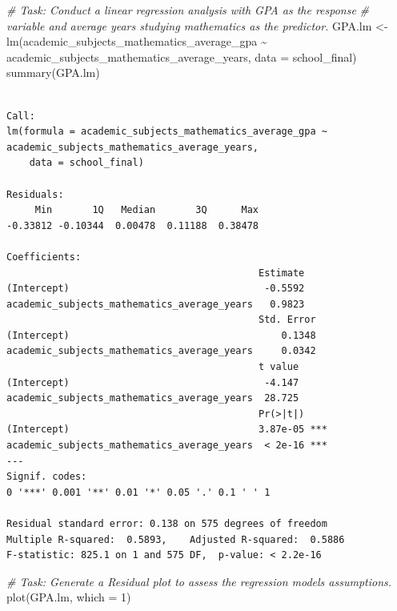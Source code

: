 \documentclass[
]{book}
\newenvironment{Shaded}{\begin{snugshade}}{\end{snugshade}}
\newcommand{\AttributeTok}[1]{\textcolor[rgb]{0.77,0.63,0.00}{#1}}
\newcommand{\CommentTok}[1]{\textcolor[rgb]{0.56,0.35,0.01}{\textit{#1}}}
\newcommand{\DecValTok}[1]{\textcolor[rgb]{0.00,0.00,0.81}{#1}}
\newcommand{\FunctionTok}[1]{\textcolor[rgb]{0.00,0.00,0.00}{#1}}
\newcommand{\NormalTok}[1]{#1}
\newcommand{\OtherTok}[1]{\textcolor[rgb]{0.56,0.35,0.01}{#1}}
\newcommand{\SpecialCharTok}[1]{\textcolor[rgb]{0.00,0.00,0.00}{#1}}
\begin{document}
\begin{Shaded}
\begin{Highlighting}[]
\CommentTok{\# Task: Conduct a linear regression analysis with GPA as the response}
\CommentTok{\# variable and average years studying mathematics as the predictor.}
\NormalTok{GPA.lm }\OtherTok{\textless{}{-}} \FunctionTok{lm}\NormalTok{(academic\_subjects\_mathematics\_average\_gpa }\SpecialCharTok{\textasciitilde{}}\NormalTok{ academic\_subjects\_mathematics\_average\_years, }
             \AttributeTok{data =}\NormalTok{ school\_final)}
\FunctionTok{summary}\NormalTok{(GPA.lm)}
\end{Highlighting}
\end{Shaded}

\begin{verbatim}

Call:
lm(formula = academic_subjects_mathematics_average_gpa ~ academic_subjects_mathematics_average_years, 
    data = school_final)

Residuals:
     Min       1Q   Median       3Q      Max 
-0.33812 -0.10344  0.00478  0.11188  0.38478 

Coefficients:
                                            Estimate
(Intercept)                                  -0.5592
academic_subjects_mathematics_average_years   0.9823
                                            Std. Error
(Intercept)                                     0.1348
academic_subjects_mathematics_average_years     0.0342
                                            t value
(Intercept)                                  -4.147
academic_subjects_mathematics_average_years  28.725
                                            Pr(>|t|)    
(Intercept)                                 3.87e-05 ***
academic_subjects_mathematics_average_years  < 2e-16 ***
---
Signif. codes:  
0 '***' 0.001 '**' 0.01 '*' 0.05 '.' 0.1 ' ' 1

Residual standard error: 0.138 on 575 degrees of freedom
Multiple R-squared:  0.5893,    Adjusted R-squared:  0.5886 
F-statistic: 825.1 on 1 and 575 DF,  p-value: < 2.2e-16
\end{verbatim}

\begin{Shaded}
\begin{Highlighting}[]
\CommentTok{\# Task: Generate a Residual plot to assess the regression model\textquotesingle{}s assumptions.}
\FunctionTok{plot}\NormalTok{(GPA.lm, }\AttributeTok{which =} \DecValTok{1}\NormalTok{)}
\end{Highlighting}
\end{Shaded}
\end{document}
